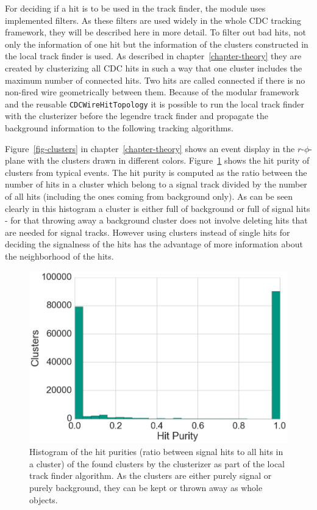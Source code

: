 For deciding if a hit is to be used in the track finder, the module uses implemented filters. As these filters are used widely in the whole CDC tracking framework, they will be described here in more detail. To filter out bad hits, not only the information of one hit but the information of the clusters constructed in the local track finder is used. As described in chapter~\ref{chapter-theory} they are created by clusterizing all CDC hits in such a way that one cluster includes the maximum number of connected hits. Two hits are called connected if there is no non-fired wire geometrically between them. Because of the modular framework and the reusable \texttt{CDCWireHitTopology} it is possible to run the local track finder with the clusterizer before the legendre track finder and propagate the background information to the following tracking algorithms. 

Figure~\ref{fig-clusters} in chapter~\ref{chapter-theory} shows an event display in the $r$-$\phi$-plane with the clusters drawn in different colors. Figure~\ref{fig-cluster-hit-purity} shows the hit purity of clusters from typical events. The hit purity is computed as the ratio between the number of hits in a cluster which belong to a signal track divided by the number of all hits (including the ones coming from background only). As can be seen clearly in this histogram a cluster is either full of background or full of signal hits - for that throwing away a background cluster does not involve deleting hits that are needed for signal tracks. However using clusters instead of single hits for deciding the signalness of the hits has the advantage of more information about the neighborhood of the hits.

\begin{figure}
  \centering
  \includegraphics[width=0.7\linewidth]{figures/workflow/cluster_purity.png}
  \caption{Histogram of the hit purities (ratio between signal hits to all hits in a cluster) of the found clusters by the clusterizer as part of the local track finder algorithm. As the clusters are either purely signal or purely background, they can be kept or thrown away as whole objects.}
  \label{fig-cluster-hit-purity}
\end{figure}

